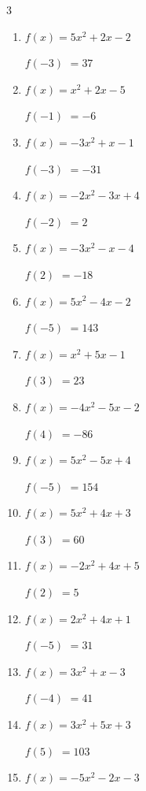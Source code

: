 \begin{multicols}{3}
\begin{enumerate}
$f(3)$
        $= -50$

\columnbreak %

  \item $f(x)=5x^{2}+2x-2$

$f(-3)$
        $= 37$

  \item $f(x)=x^{2}+2x-5$

$f(-1)$
        $= -6$

  \item $f(x)=-3x^{2}+x-1$

$f(-3)$
        $= -31$

  \item $f(x)=-2x^{2}-3x+4$

$f(-2)$
        $= 2$

  \item $f(x)=-3x^{2}-x-4$

$f(2)$
        $= -18$

  \item $f(x)=5x^{2}-4x-2$

$f(-5)$
        $= 143$

  \item $f(x)=x^{2}+5x-1$

$f(3)$
        $= 23$

  \item $f(x)=-4x^{2}-5x-2$

$f(4)$
        $= -86$

  \item $f(x)=5x^{2}-5x+4$

$f(-5)$
        $= 154$

  \item $f(x)=5x^{2}+4x+3$

$f(3)$
        $= 60$

  \item $f(x)=-2x^{2}+4x+5$

$f(2)$
        $= 5$

  \item $f(x)=2x^{2}+4x+1$

$f(-5)$
        $= 31$

  \item $f(x)=3x^{2}+x-3$

$f(-4)$
        $= 41$

  \item $f(x)=3x^{2}+5x+3$

$f(5)$
        $= 103$

  \item $f(x)=-5x^{2}-2x-3$


\end{enumerate}
\end{multicols}
